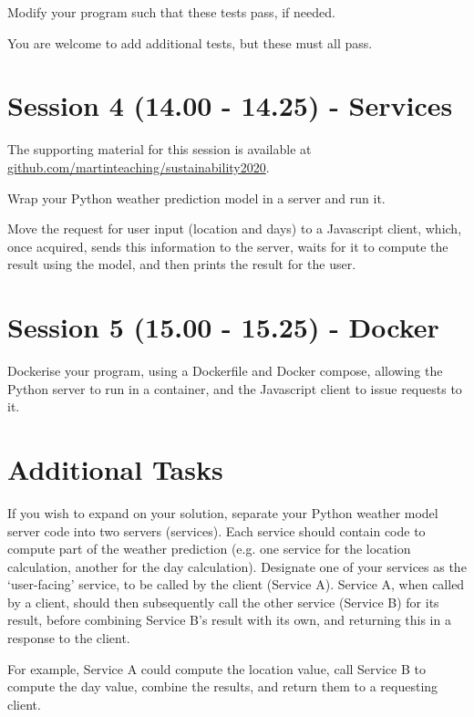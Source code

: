 \documentclass{article}
\begin{document}
Modify your program such that these tests pass, if needed.

You are welcome to add additional tests, but these must all pass.

\section{Session 4 (14.00 - 14.25) - Services}

The supporting material for this session is available at \href{https://github.com/martinteaching/sustainability2020}{github.com/martinteaching/sustainability2020}.

Wrap your Python weather prediction model in a server and run it.

Move the request for user input (location and days) to a Javascript client,
which, once acquired, sends this information to the server, waits for it to compute
the result using the model, and then prints the result for the user.

\section{Session 5 (15.00 - 15.25) - Docker}

Dockerise your program, using a Dockerfile and Docker compose, allowing the Python server to run in a container, and the Javascript client to issue requests to it.

\section{Additional Tasks}

If you wish to expand on your solution, separate your Python weather model server code into
two servers (services). Each service should contain code to compute part of 
the weather prediction (e.g. one service for the location calculation, another
for the day calculation). Designate one of your services as the `user-facing'
service, to be called by the client (Service A). Service A, when called by a client, should then subsequently call the other service (Service B) for its result, before combining Service B's result with its own, and returning this in a response to the client. 

For example, Service A
could compute the location value, call Service B to compute the day value, combine
the results, and return them to a requesting client.
\end{document}
